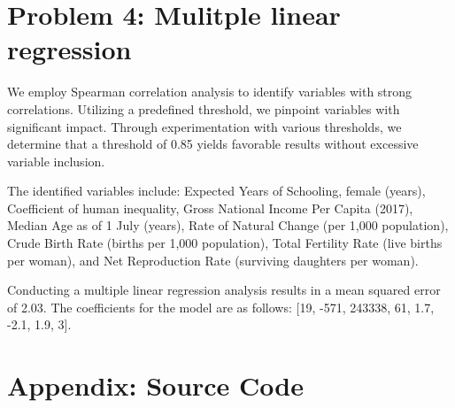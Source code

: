 \documentclass[a4paper]{article}
\begin{document}
\section*{Problem 4: Mulitple linear regression}

We employ Spearman correlation analysis to identify variables with strong correlations. Utilizing a predefined threshold, we pinpoint variables with significant impact. 
Through experimentation with various thresholds, we determine that a threshold of 0.85 yields favorable results without excessive variable inclusion.

The identified variables include: Expected Years of Schooling, female (years), Coefficient of human inequality, Gross National Income Per Capita (2017), Median Age as of 1 July (years), Rate of Natural Change (per 1,000 population), Crude Birth Rate (births per 1,000 population), Total Fertility Rate (live births per woman), and Net Reproduction Rate (surviving daughters per woman).

Conducting a multiple linear regression analysis results in a mean squared error of 2.03. The coefficients for the model are as follows: [19, -571, 243338, 61, 1.7, -2.1, 1.9, 3].




\newpage


\printbibliography

\section*{Appendix: Source Code}




\end{document}
